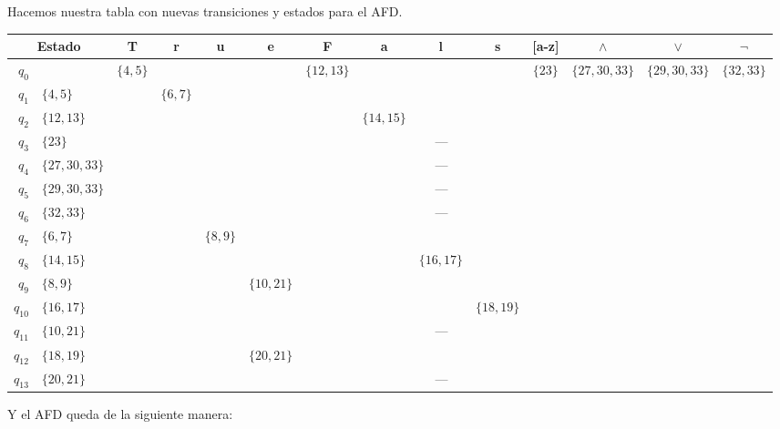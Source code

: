 \documentclass[12pt, letterpaper]{article}
\begin{document}
\begin{enumerate}
    Hacemos nuestra tabla con nuevas transiciones y estados para el AFD.

    \begin{table}[htbp]
      \centering
      \setlength{\tabcolsep}{0.25pt}
      \renewcommand{\arraystretch}{1.3} %
      \begin{tabular}{r l | c c c c c c c c c c c c}
        \toprule
        \multicolumn{2}{c|}{\textbf{Estado}} & \textbf{T} & \textbf{r} & \textbf{u} & \textbf{e} & \textbf{F} & \textbf{a} & \textbf{l} & \textbf{s} & \textbf{[a-z]} & $\boldsymbol{\wedge}$ & $\boldsymbol{\vee}$ & $\boldsymbol{\neg}$ \\
        \midrule
        $q_0$    &                    & $\{4, 5\}$ & & & & $\{12, 13\}$ & & & & $\{23\}$ & $\{27, 30, 33\}$ & $\{29, 30, 33\}$ & $\{32, 33\}$ \\
        $q_1$    & $\{4, 5\}$         & & $\{6, 7\}$ & & & & & & & & & & \\
        $q_2$    & $\{12, 13\}$       & & & & & & $\{14, 15\}$ & & & & & & \\
        $q_3$    & $\{23\}$           & \multicolumn{12}{c}{---} \\
        $q_4$    & $\{27, 30, 33\}$   & \multicolumn{12}{c}{---} \\
        $q_5$    & $\{29, 30, 33\}$   & \multicolumn{12}{c}{---} \\
        $q_6$    & $\{32, 33\}$       & \multicolumn{12}{c}{---} \\
        $q_7$    & $\{6, 7\}$         & & & $\{8, 9\}$ & & & & & & & & & \\
        $q_8$    & $\{14, 15\}$       & & & & & & & $\{16, 17\}$ & & & & & \\
        $q_9$    & $\{8, 9\}$         & & & & $\{10, 21\}$ & & & & & & & & \\
        $q_{10}$ & $\{16, 17\}$       & & & & & & & & $\{18, 19\}$ & & & & \\
        $q_{11}$ & $\{10, 21\}$       & \multicolumn{12}{c}{---} \\
        $q_{12}$ & $\{18, 19\}$       & & & & $\{20, 21\}$ & & & & & & & & \\
        $q_{13}$ & $\{20, 21\}$       & \multicolumn{12}{c}{---} \\
        \bottomrule
      \end{tabular}
      \label{tab:afd_transiciones}
    \end{table}
    Y el AFD queda de la siguiente manera:\\
    \begin{tikzpicture}[
        ->, >=Stealth, auto,
        node distance=1.6cm and 1.6cm,
        every state/.style={thick},
        initial text=,
        scale=0.95, every node/.style={scale=0.95}
      ]


\end{tikzpicture}
\end{enumerate}
\end{document}
